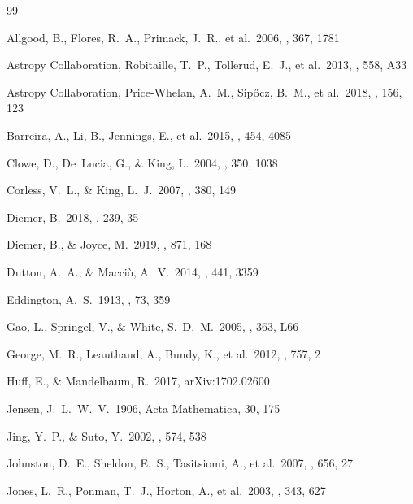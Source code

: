 \documentclass[12pt,a4paper]{article}
\begin{document}


\begin{thebibliography}{99}

Allgood, B., Flores, R.~A., Primack, J.~R., et al.\ 2006, \mnras, 367, 1781

Astropy Collaboration, Robitaille, T.~P., Tollerud, E.~J., et al.\ 2013, \aap, 558, A33

Astropy Collaboration, Price-Whelan, A.~M., Sip{\H o}cz, B.~M., et al.\ 2018, \aj, 156, 123

Barreira, A., Li, B., Jennings, E., et al.\ 2015, \mnras, 454, 4085

Clowe, D., De~Lucia, G., \& King, L.\ 2004, \mnras, 350, 1038

Corless, V.~L., \& King, L.~J.\ 2007, \mnras, 380, 149

Diemer, B.\ 2018, \apjs, 239, 35

Diemer, B., \& Joyce, M.\ 2019, \apj, 871, 168

Dutton, A.~A., \& Macci\`o, A.~V.\ 2014, \mnras, 441, 3359

Eddington, A.~S.\ 1913, \mnras, 73, 359

Gao, L., Springel, V., \& White, S.~D.~M.\ 2005, \mnrasl, 363, L66

George, M.~R., Leauthaud, A., Bundy, K., et al.\ 2012, \apj, 757, 2

Huff, E., \& Mandelbaum, R.\ 2017, arXiv:1702.02600

Jensen, J.~L.~W.~V.\ 1906, Acta Mathematica, 30, 175

Jing, Y.~P., \& Suto, Y.\ 2002, \apj, 574, 538

Johnston, D.~E., Sheldon, E.~S., Tasitsiomi, A., et al.\ 2007, \apj, 656, 27

Jones, L.~R., Ponman, T.~J., Horton, A., et al.\ 2003, \mnras, 343, 627


\end{thebibliography}
\end{document}
